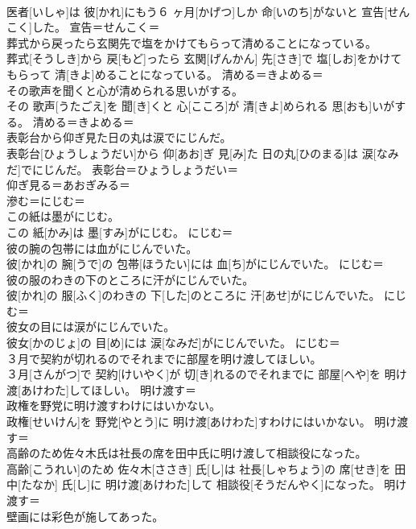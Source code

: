 \documentclass[8pt]{extreport}
\begin{document}
\begin{CJK}{UTF8}{min}
\\	医者[いしゃ]は 彼[かれ]にもう６ ヶ月[かげつ]しか 命[いのち]がないと 宣告[せんこく]した。	宣告＝せんこく＝ 
\\	葬式から戻ったら玄関先で塩をかけてもらって清めることになっている。	
\\	葬式[そうしき]から 戻[もど]ったら 玄関[げんかん] 先[さき]で 塩[しお]をかけてもらって 清[きよ]めることになっている。	清める＝きよめる＝ 
\\	その歌声を聞くと心が清められる思いがする。	
\\	その 歌声[うたごえ]を 聞[き]くと 心[こころ]が 清[きよ]められる 思[おも]いがする。	清める＝きよめる＝ 
\\	表彰台から仰ぎ見た日の丸は涙でにじんだ。	
\\	表彰台[ひょうしょうだい]から 仰[あお]ぎ 見[み]た 日の丸[ひのまる]は 涙[なみだ]でにじんだ。	表彰台＝ひょうしょうだい＝ 
\\	仰ぎ見る＝あおぎみる＝ 
\\	滲む＝にじむ＝ 
\\	この紙は墨がにじむ。	
\\	この 紙[かみ]は 墨[すみ]がにじむ。	にじむ＝ 
\\	彼の腕の包帯には血がにじんでいた。	
\\	彼[かれ]の 腕[うで]の 包帯[ほうたい]には 血[ち]がにじんでいた。	にじむ＝ 
\\	彼の服のわきの下のところに汗がにじんでいた。	
\\	彼[かれ]の 服[ふく]のわきの 下[した]のところに 汗[あせ]がにじんでいた。	にじむ＝ 
\\	彼女の目には涙がにじんでいた。	
\\	彼女[かのじょ]の 目[め]には 涙[なみだ]がにじんでいた。	にじむ＝ 
\\	３月で契約が切れるのでそれまでに部屋を明け渡してほしい。	
\\	３月[さんがつ]で 契約[けいやく]が 切[き]れるのでそれまでに 部屋[へや]を 明け渡[あけわた]してほしい。	明け渡す＝ 
\\	政権を野党に明け渡すわけにはいかない。	
\\	政権[せいけん]を 野党[やとう]に 明け渡[あけわた]すわけにはいかない。	明け渡す＝ 
\\	高齢のため佐々木氏は社長の席を田中氏に明け渡して相談役になった。	
\\	高齢[こうれい]のため 佐々木[ささき] 氏[し]は 社長[しゃちょう]の 席[せき]を 田中[たなか] 氏[し]に 明け渡[あけわた]して 相談役[そうだんやく]になった。	明け渡す＝ 
\\	壁画には彩色が施してあった。	

\end{CJK}
\end{document}
